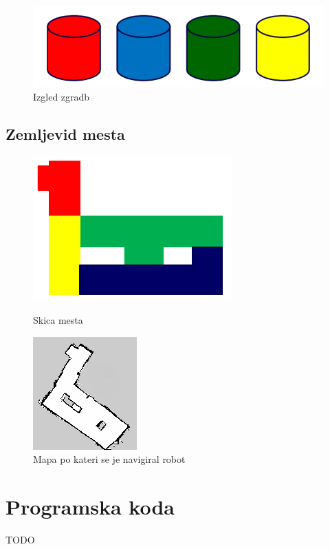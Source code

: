 \documentclass[a4paper,11pt]{article}
\begin{document}
\begin{figure}[htbp]
\begin{center}
\includegraphics[width=\textwidth]{buildings.png}
\caption{Izgled zgradb}
\label{slika1}
\end{center}
\end{figure}


\pagebreak
\subsection{Zemljevid mesta}
\begin{figure}[!tbp]
  \centering
  \begin{minipage}[b]{0.2\textwidth}
	\includegraphics[scale=0.6]{city.png}
	\caption{Skica mesta}
  \end{minipage}
  \hfill
  \begin{minipage}[b]{0.2\textwidth}
	\includegraphics[scale=1]{robotMap.png}
	\caption{Mapa po kateri se je navigiral robot}
  \end{minipage}
\end{figure}



\section{\label{app-code}Programska koda}

TODO
\end{document}

